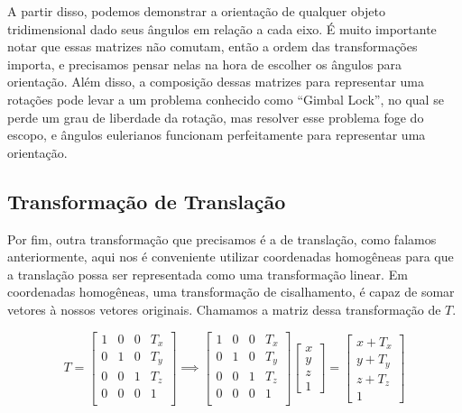 \documentclass[12pt]{article}
\begin{document}
A partir disso, podemos demonstrar a orientação de qualquer objeto tridimensional dado seus ângulos em relação a cada eixo. É muito importante notar que essas matrizes não comutam, então a ordem das transformações importa, e precisamos pensar nelas na hora de escolher os ângulos para orientação. Além disso, a composição dessas matrizes para representar uma rotações pode levar a um problema conhecido como ``Gimbal Lock'', no qual se perde um grau de liberdade da rotação, mas resolver esse problema foge do escopo, e ângulos eulerianos funcionam perfeitamente para representar uma orientação.

\subsection{Transformação de Translação}\label{translation_transform}

Por fim, outra transformação que precisamos é a de translação, como falamos anteriormente, aqui nos é conveniente utilizar coordenadas homogêneas para que a translação possa ser representada como uma transformação linear. Em coordenadas homogêneas, uma transformação de cisalhamento, é capaz de somar vetores à nossos vetores originais. Chamamos a matriz dessa transformação de $T$.

\[
T =
\begin{bmatrix}
    1 & 0 & 0 & T_{x} \\
    0 & 1 & 0 & T_{y} \\
    0 & 0 & 1 & T_{z} \\
    0 & 0 & 0 & 1 \\
\end{bmatrix}
\implies
\begin{bmatrix}
    1 & 0 & 0 & T_{x} \\
    0 & 1 & 0 & T_{y} \\
    0 & 0 & 1 & T_{z} \\
    0 & 0 & 0 & 1 \\
\end{bmatrix}
\begin{bmatrix}
    x \\
    y \\
    z \\
    1
\end{bmatrix} 
=
\begin{bmatrix}
    x + T_{x}\\
    y + T_{y}\\
    z + T_{z}\\
    1
\end{bmatrix}
\]
\end{document}
